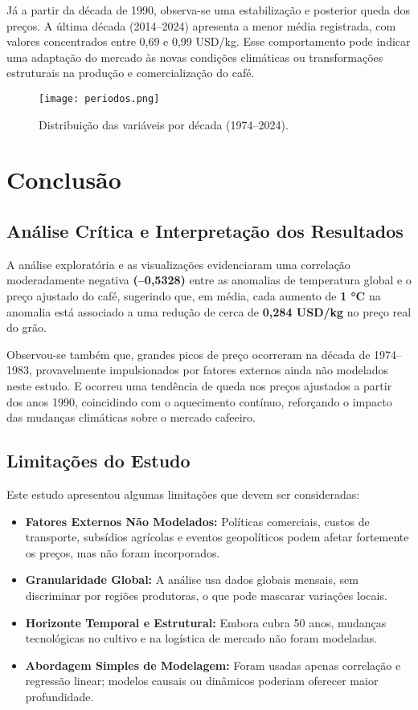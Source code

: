 \documentclass[12pt]{article}
\begin{document}
Já a partir da década de 1990, observa-se uma estabilização e posterior queda dos preços. A última década (2014–2024) apresenta a menor média registrada, com valores concentrados entre 0,69 e 0,99 USD/kg. Esse comportamento pode indicar uma adaptação do mercado às novas condições climáticas ou transformações estruturais na produção e comercialização do café.

\begin{figure}[ht]
\centering
\texttt{[image: periodos.png]}
\caption{Distribuição das variáveis por década (1974–2024).}
\label{fig:periodos}
\end{figure}

\section{Conclusão}

\subsection{Análise Crítica e Interpretação dos Resultados}
A análise exploratória e as visualizações evidenciaram uma correlação moderadamente negativa \textbf{(–0,5328)} entre as anomalias de temperatura global e o preço ajustado do café, sugerindo que, em média, cada aumento de \textbf{1 °C} na anomalia está associado a uma redução de cerca de \textbf{0,284 USD/kg} no preço real do grão. 

Observou-se também que, grandes picos de preço ocorreram na década de 1974–1983, provavelmente impulsionados por fatores externos ainda não modelados neste estudo. E ocorreu uma tendência de queda nos preços ajustados a partir dos anos 1990, coincidindo com o aquecimento contínuo, reforçando o impacto das mudanças climáticas sobre o mercado cafeeiro.

\subsection{Limitações do Estudo}
Este estudo apresentou algumas limitações que devem ser consideradas:

\begin{itemize}  
  \item \textbf{Fatores Externos Não Modelados:} Políticas comerciais, custos de transporte, subsídios agrícolas e eventos geopolíticos podem afetar fortemente os preços, mas não foram incorporados.
  \item \textbf{Granularidade Global:} A análise usa dados globais mensais, sem discriminar por regiões produtoras, o que pode mascarar variações locais.
  \item \textbf{Horizonte Temporal e Estrutural:} Embora cubra 50 anos, mudanças tecnológicas no cultivo e na logística de mercado não foram modeladas.
  \item \textbf{Abordagem Simples de Modelagem:} Foram usadas apenas correlação e regressão linear; modelos causais ou dinâmicos poderiam oferecer maior profundidade.
\end{itemize}
\end{document}
